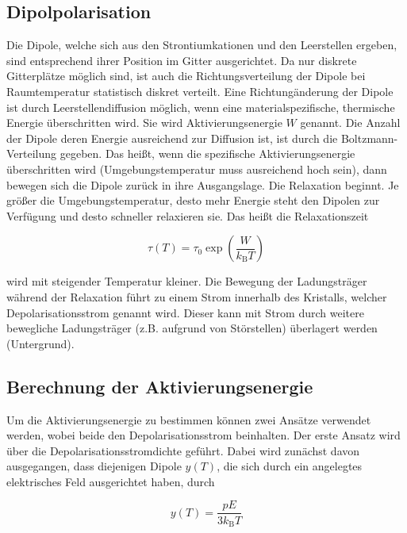 \subsection{Dipolpolarisation}
\label{sec:Dipolpolarisation}

Die Dipole, welche sich aus den Strontiumkationen und den Leerstellen ergeben, 
sind entsprechend ihrer Position im Gitter ausgerichtet. Da nur diskrete 
Gitterplätze möglich sind, ist auch die Richtungsverteilung der Dipole bei 
Raumtemperatur statistisch diskret verteilt. Eine Richtungänderung der 
Dipole ist durch Leerstellendiffusion möglich, wenn eine materialspezifische, 
thermische Energie überschritten wird. Sie wird Aktivierungsenergie $W$ genannt. 
Die Anzahl der Dipole deren Energie ausreichend zur Diffusion ist, ist durch die 
Boltzmann-Verteilung gegeben. Das heißt, wenn die spezifische Aktivierungsenergie 
überschritten wird  (Umgebungstemperatur muss ausreichend hoch sein), dann bewegen sich 
die Dipole zurück in ihre Ausgangslage. Die Relaxation beginnt. 
Je größer die Umgebungstemperatur, desto mehr Energie steht den Dipolen zur Verfügung 
und desto schneller relaxieren sie. Das heißt die Relaxationszeit 

\begin{equation}
    \tau(T) = \tau_0 \exp{\left(\frac{W}{k_\text{B}T}\right)}
    \label{eq1}
\end{equation}

wird mit steigender Temperatur kleiner. Die Bewegung der Ladungsträger während der 
Relaxation führt zu einem Strom innerhalb des Kristalls, welcher 
Depolarisationsstrom genannt wird. Dieser kann mit Strom durch
weitere bewegliche Ladungsträger (z.B. aufgrund von Störstellen) überlagert werden
(Untergrund).


\subsection{Berechnung der Aktivierungsenergie}
\label{sec:Aktivierungsenergie}

Um die Aktivierungsenergie zu bestimmen können zwei Ansätze verwendet werden,
wobei beide den Depolarisationsstrom beinhalten.
Der erste Ansatz wird über die Depolarisationsstromdichte
geführt. Dabei wird zunächst davon ausgegangen, dass diejenigen Dipole $y(T)$, die 
sich durch ein angelegtes elektrisches Feld ausgerichtet haben, durch 

\begin{equation*}
    y(T) = \frac{p E}{3 k_{\text{B}} T} 
\end{equation*}

